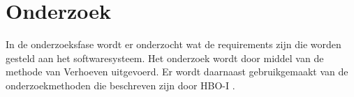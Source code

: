 \chapter{Onderzoek}
\label{chap:Onderzoek}
In de onderzoeksfase wordt er onderzocht wat de requirements zijn die worden gesteld aan het softwaresysteem.
Het onderzoek wordt door middel van de methode van Verhoeven \Parencite{Verhoeven} uitgevoerd.
Er wordt daarnaast gebruikgemaakt van de onderzoekmethoden die beschreven zijn door HBO-I \Parencite{HBO-i-reasearch-methods}.





% 
